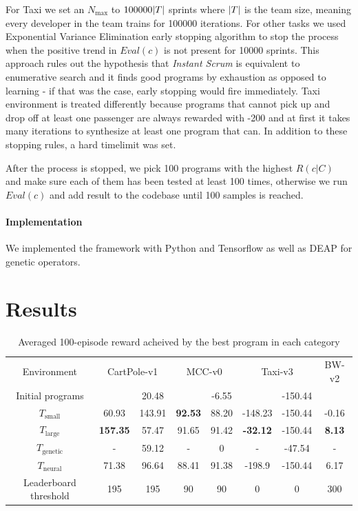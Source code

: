 For Taxi we set an $N_\text{max}$ to $100000 |T|$ sprints where $|T|$ is the team size, meaning every developer in the team trains for 100000 iterations.
For other tasks we used Exponential Variance Elimination \cite{evestop} early stopping algorithm to stop the process when the positive trend in $Eval(c)$ is not present for 10000 sprints.
This approach rules out the hypothesis that \emph{Instant Scrum} is equivalent to enumerative search and it finds good programs by exhaustion as opposed to learning - if that was the case, early stopping would fire immediately.
Taxi environment is treated differently because programs that cannot pick up and drop off at least one passenger are always rewarded with -200 and at first it takes many iterations to synthesize at least one program that can.
In addition to these stopping rules, a hard timelimit was set.

After the process is stopped, we pick 100 programs with the highest $R(c|C)$ and make sure each of them has been tested at least 100 times, otherwise we run $Eval(c)$ and add result to the codebase until 100 samples is reached. 

\paragraph{Implementation}

We implemented the framework with Python and Tensorflow as well as DEAP \cite{deap} for genetic operators.

\newpage
\section{Results}
\label{sec:neurgen-results}

\begin{table}[]
    \centering
    \begin{tabular}{c|c|c|c|c|c|c|c}
         Environment & \multicolumn{2}{c}{CartPole-v1} & \multicolumn{2}{c}{MCC-v0} & \multicolumn{2}{c}{Taxi-v3} & BW-v2 \\
         Initial programs & & 20.48 & & -6.55 & & -150.44 & \\
         \midrule
         $T_\text{small}$  &    60.93 &    143.91 &     \textbf{92.53} &     88.20 &   -148.23 &   -150.44 &     -0.16\\
         $T_\text{large}$ & \textbf{157.35} &     57.47 &     91.65 &     91.42 &    \textbf{-32.12} &   -150.44 &      \textbf{8.13} \\ 
         $T_\text{genetic}$& - & 59.12 & - & 0 & - & -47.54 & - \\ 
         $T_\text{neural}$ & 71.38 & 96.64 & 88.41 & 91.38 & -198.9 & -150.44 & 6.17 \\
         \midrule
         Leaderboard threshold & 195 & 195 & 90 & 90 & 0 & 0 & 300 \\ 
    \end{tabular}
    \caption{Averaged 100-episode reward acheived by the best program in each category}
    \label{tab:neurogenetic-results}
\end{table}

